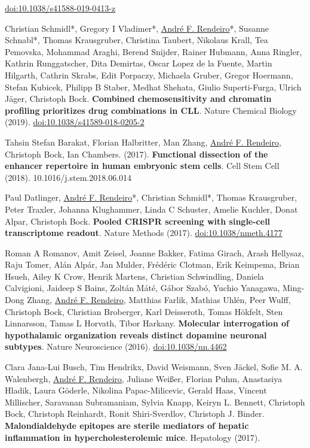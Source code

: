 \documentclass[11pt,a4paper,roman]{moderncv} %
\begin{document}
\begin{etaremune}[leftmargin=1.0cm, itemindent=0pt, topsep=10pt, itemsep=2pt, partopsep=0pt, parsep=0pt]
        \href{https://dx.doi.org/10.1038/s41588-019-0413-z}{doi:10.1038/s41588-019-0413-z}
        \item Christian Schmidl*, Gregory I Vladimer*, \underline{André F. Rendeiro}*, Susanne Schnabl*, Thomas Krausgruber, Christina Taubert, Nikolaus Krall, Tea Pemovska, Mohammad Araghi, Berend Snijder, Rainer Hubmann, Anna Ringler, Kathrin Runggatscher, Dita Demirtas, Oscar Lopez de la Fuente, Martin Hilgarth, Cathrin Skrabs, Edit Porpaczy, Michaela Gruber, Gregor Hoermann, Stefan Kubicek, Philipp B Staber, Medhat Shehata, Giulio Superti-Furga, Ulrich Jäger, Christoph Bock. \textbf{Combined chemosensitivity and chromatin profiling prioritizes drug combinations in CLL}. Nature Chemical Biology (2019).
        \href{https://dx.doi.org/10.1038/s41589-018-0205-2}{doi:10.1038/s41589-018-0205-2}
        \item Tahsin Stefan Barakat, Florian Halbritter, Man Zhang, \underline{André F. Rendeiro}, Christoph Bock, Ian Chambers. (2017). \textbf{Functional dissection of the enhancer repertoire in human embryonic stem cells}. Cell Stem Cell (2018). 10.1016/j.stem.2018.06.014
        \item Paul Datlinger, \underline{André F. Rendeiro}*, Christian Schmidl*, Thomas Krausgruber, Peter Traxler, Johanna Klughammer, Linda C Schuster, Amelie Kuchler, Donat Alpar, Christoph Bock. \textbf{Pooled CRISPR screening with single-cell transcriptome readout}. Nature Methods (2017).
        \href{https://dx.doi.org/10.1038/nmeth.4177}{doi:10.1038/nmeth.4177}
        \item Roman A Romanov, Amit Zeisel, Joanne Bakker, Fatima Girach, Arash Hellysaz, Raju Tomer, Alán Alpár, Jan Mulder, Frédéric Clotman, Erik Keimpema, Brian Hsueh, Ailey K Crow, Henrik Martens, Christian Schwindling, Daniela Calvigioni, Jaideep S Bains, Zoltán Máté, Gábor Szabó, Yuchio Yanagawa, Ming-Dong Zhang, \underline{André F. Rendeiro}, Matthias Farlik, Mathias Uhlén, Peer Wulff, Christoph Bock, Christian Broberger, Karl Deisseroth, Tomas Hökfelt, Sten Linnarsson, Tamas L Horvath, Tibor Harkany. \textbf{Molecular interrogation of hypothalamic organization reveals distinct dopamine neuronal subtypes}. Nature Neuroscience (2016).
        \href{https://dx.doi.org/10.1038/nn.4462}{doi:10.1038/nn.4462}
        \item Clara Jana-Lui Busch, Tim Hendrikx, David Weismann, Sven Jäckel, Sofie M. A. Walenbergh, \underline{André F. Rendeiro}, Juliane Weißer, Florian Puhm, Anastasiya Hladik, Laura Göderle, Nikolina Papac-Milicevic, Gerald Haas, Vincent Millischer, Saravanan Subramaniam, Sylvia Knapp, Keiryn L. Bennett, Christoph Bock, Christoph Reinhardt, Ronit Shiri-Sverdlov, Christoph J. Binder. \textbf{Malondialdehyde epitopes are sterile mediators of hepatic inflammation in hypercholesterolemic mice}. Hepatology (2017).

\end{etaremune}
\end{document}

